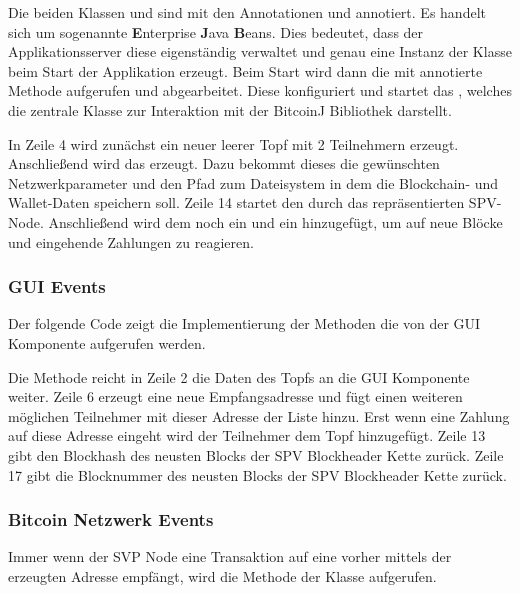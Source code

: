 
Die beiden Klassen  und  sind mit den Annotationen und  annotiert. Es handelt sich um sogenannte \textbf{E}nterprise \textbf{J}ava \textbf{B}eans. Dies bedeutet, dass der Applikationsserver diese eigenständig verwaltet und genau eine Instanz der Klasse beim Start der Applikation erzeugt. Beim Start wird dann die mit  annotierte  Methode aufgerufen und abgearbeitet. Diese konfiguriert und startet das , welches die zentrale Klasse zur Interaktion mit der BitcoinJ Bibliothek darstellt.

 In Zeile 4 wird zunächst ein neuer leerer Topf mit 2 Teilnehmern erzeugt. Anschließend wird das  erzeugt. Dazu bekommt dieses die gewünschten Netzwerkparameter und den Pfad zum Dateisystem in dem  die Blockchain- und Wallet-Daten speichern soll. Zeile 14 startet den durch das  repräsentierten SPV-Node. Anschließend wird dem  noch ein  und ein  hinzugefügt, um auf neue Blöcke und eingehende Zahlungen zu reagieren.

\subsubsection{GUI Events}

Der folgende Code zeigt die Implementierung der Methoden die von der GUI Komponente aufgerufen werden.

Die Methode  reicht in Zeile 2 die Daten des Topfs an die GUI Komponente weiter. Zeile 6 erzeugt eine neue Empfangsadresse und fügt einen weiteren möglichen Teilnehmer mit dieser Adresse der  Liste hinzu. Erst wenn eine Zahlung auf diese Adresse eingeht wird der Teilnehmer dem Topf hinzugefügt. Zeile 13 gibt den Blockhash des neusten Blocks der SPV Blockheader Kette zurück. Zeile 17 gibt die Blocknummer des neusten Blocks der SPV Blockheader Kette zurück.

\subsubsection{Bitcoin Netzwerk Events}

Immer wenn der SVP Node eine Transaktion auf eine vorher mittels der\\  erzeugten Adresse empfängt, wird die  Methode der Klasse  aufgerufen.

